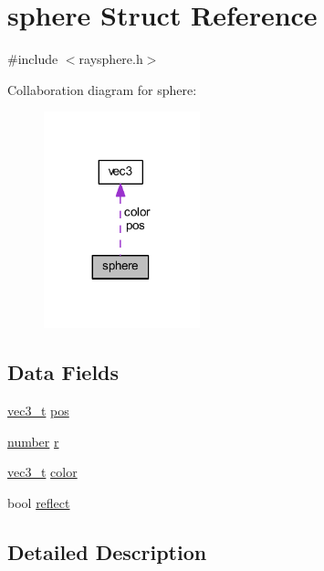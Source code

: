 \hypertarget{structsphere}{}\section{sphere Struct Reference}
\label{structsphere}


{\ttfamily \#include $<$raysphere.\+h$>$}



Collaboration diagram for sphere\+:\nopagebreak
\begin{figure}[H]
\begin{center}
\leavevmode
\includegraphics[width=128pt]{structsphere__coll__graph}
\end{center}
\end{figure}
\subsection*{Data Fields}
\begin{DoxyCompactItemize}
\item 
\hyperlink{raymath_8h_afb3684d7701a8417d1a52fd94c84457c}{vec3\+\_\+t} \hyperlink{structsphere_a81150a53dd49f693e71a6d68b213d99c}{pos}
\item 
\hyperlink{raymath_8h_aa97c1f529dc5a11a78758184c84a39c9}{number} \hyperlink{structsphere_a62fdcf65e893d786475a61de9f32f1e0}{r}
\item 
\hyperlink{raymath_8h_afb3684d7701a8417d1a52fd94c84457c}{vec3\+\_\+t} \hyperlink{structsphere_af1ec6dab64553dc67dc77bdc13deecb8}{color}
\item 
bool \hyperlink{structsphere_ac89a0bd6b5d17bfe81528537757ff5d8}{reflect}
\end{DoxyCompactItemize}


\subsection{Detailed Description}


